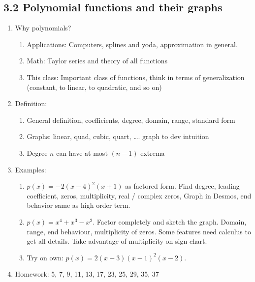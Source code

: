 \documentclass{article}
\begin{document}
\subsection{3.2 Polynomial functions and their graphs}

\begin{enumerate}

\item Why polynomials?
\begin{enumerate}
\item Applications: Computers, splines and yoda, approximation in general.
\item Math: Taylor series and theory of all functions
\item This class: Important class of functions, think in terms of generalization (constant, to linear, to quadratic, and so on)
\end{enumerate}


\item Definition:
\begin{enumerate}
\item General definition, coefficients, degree, domain, range, standard form 
\item Graphs: linear, quad, cubic, quart, …. graph to dev intuition
\item Degree $n$ can have at most $(n-1)$ extrema
\end{enumerate}

\item Examples:
\begin{enumerate}
\item $p(x)=-2(x-4)^2(x+1)$ as factored form. Find degree, leading coefficient, zeros, multiplicity, real / complex zeros, Graph in Desmos, end behavior same as high order term.
\item $p(x) = x^4+x^3-x^2$. Factor completely and sketch the graph. Domain, range, end behaviour, multiplicity of zeros. Some features need calculus to get all details.
Take advantage of multiplicity on sign chart.
\item Try on own: $p(x) = 2(x+3)(x-1)^2(x-2)$.
\end{enumerate}

\item Homework: 5, 7, 9, 11, 13, 17, 23, 25, 29, 35, 37

\end{enumerate}


\end{document}
